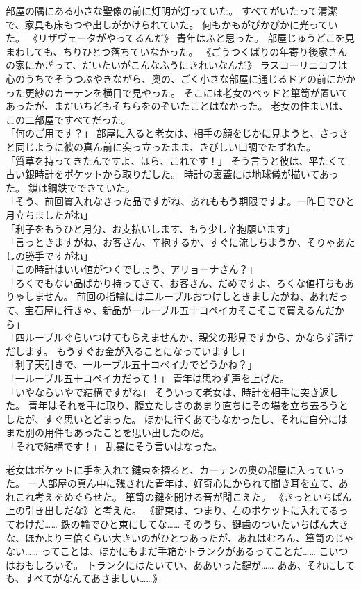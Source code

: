 部屋の隅にある小さな聖像の前に灯明が灯っていた。
すべてがいたって清潔で、家具も床もつや出しがかけられていた。
何もかもがぴかぴかに光っていた。
《リザヴェータがやってるんだ》
青年はふと思った。
部屋じゅうどこを見まわしても、ちりひとつ落ちていなかった。
《ごうつくばりの年寄り後家さんの家にかぎって、だいたいがこんなふうにきれいなんだ》
ラスコーリニコフは心のうちでそうつぶやきながら、奥の、ごく小さな部屋に通じるドアの前にかかった更紗のカーテンを横目で見やった。
そこには老女のベッドと箪笥が置いてあったが、まだいちどもそちらをのぞいたことはなかった。
老女の住まいは、この二部屋ですべてだった。\\
「何のご用です？」
部屋に入ると老女は、相手の顔をじかに見ようと、さっきと同じように彼の真ん前に突っ立ったまま、きびしい口調でたずねた。\\
「質草を持ってきたんですよ、ほら、これです！」
そう言うと彼は、平たくて古い銀時計をポケットから取りだした。
時計の裏蓋には地球儀が描いてあった。
鎖は鋼鉄でできていた。\\
「そう、前回質入れなさった品ですがね、あれももう期限ですよ。一昨日でひと月立ちましたがね」\\
「利子をもうひと月分、お支払いします、もう少し辛抱願います」\\
「言っときますがね、お客さん、辛抱するか、すぐに流しちまうか、そりゃあたしの勝手ですがね」\\
「この時計はいい値がつくでしょう、アリョーナさん？」\\
「ろくでもない品ばかり持ってきて、お客さん、だめですよ、ろくな値打ちもありゃしません。
前回の指輪には二ルーブルおつけしときましたがね、あれだって、宝石屋に行きゃ、新品が一ルーブル五十コペイカそこそこで買えるんだから」\\
「四ルーブルぐらいつけてもらえませんか、親父の形見ですから、かならず請けだします。
もうすぐお金が入ることになっていますし」\\
「利子天引きで、一ルーブル五十コペイカでどうかね？」\\
「一ルーブル五十コペイカだって！」
青年は思わず声を上げた。\\
「いやならいやで結構ですがね」
そういって老女は、時計を相手に突き返した。
青年はそれを手に取り、腹立たしさのあまり直ちにその場を立ち去ろうとしたが、すぐ思いとどまった。
ほかに行くあてもなかったし、それに自分にはまた別の用件もあったことを思い出したのだ。\\
「それで結構です！」
乱暴にそう言いはなった。

老女はポケットに手を入れて鍵束を探ると、カーテンの奥の部屋に入っていった。
一人部屋の真ん中に残された青年は、好奇心にかられて聞き耳を立て、あれこれ考えをめぐらせた。
箪笥の鍵を開ける音が聞こえた。
《きっといちばん上の引き出しだな》と考えた。
《鍵束は、つまり、右のポケットに入れてるってわけだ……
鉄の輪でひと束にしてな……
そのうち、鍵歯のついたいちばん大きな、ほかより三倍くらい大きいのがひとつあったが、あれはむろん、箪笥のじゃない……
ってことは、ほかにもまだ手箱かトランクがあるってことだ……
こいつはおもしろいぞ。
トランクにはたいてい、ああいった鍵が……
ああ、それにしても、すべてがなんてあさましい……》


